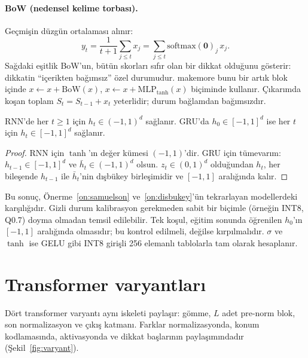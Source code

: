 \paragraph{BoW (nedensel kelime torbası).} Geçmişin düzgün ortalaması alınır:
\begin{equation}
  y_t = \frac{1}{t+1} \sum_{j \le t} x_j = \sum_{j\le t} \mathrm{softmax}(\mathbf{0})_j\, x_j .
\end{equation}
Sağdaki eşitlik BoW'un, bütün skorları sıfır olan bir dikkat olduğunu gösterir: dikkatin ``içerikten bağımsız'' özel durumudur. makemore bunu bir artık blok içinde $x \leftarrow x + \mathrm{BoW}(x)$, $x \leftarrow x + \mathrm{MLP}_{\tanh}(x)$ biçiminde kullanır. Çıkarımda koşan toplam $S_t = S_{t-1} + x_t$ yeterlidir; durum bağlamdan bağımsızdır.

\begin{onerme}\label{on:rnn}
RNN'de her $t \ge 1$ için $h_t \in (-1,1)^d$ sağlanır. GRU'da $h_0 \in [-1,1]^d$ ise her $t$ için $h_t \in [-1,1]^d$ sağlanır.
\end{onerme}
\begin{proof}
RNN için $\tanh$'ın değer kümesi $(-1,1)$'dir. GRU için tümevarım: $h_{t-1} \in [-1,1]^d$ ve $\bar h_t \in (-1,1)^d$ olsun. $z_t \in (0,1)^d$ olduğundan $h_t$, her bileşende $h_{t-1}$ ile $\bar h_t$'nin dışbükey birleşimidir ve $[-1,1]$ aralığında kalır.
\end{proof}

\noindent Bu sonuç, Önerme~\ref{on:samuelson} ve~\ref{on:disbukey}'ün tekrarlayan modellerdeki karşılığıdır. Gizli durum kalibrasyon gerekmeden sabit bir biçimle (örneğin INT8, Q0.7) doyma olmadan temsil edilebilir. Tek koşul, eğitim sonunda öğrenilen $h_0$'ın $[-1,1]$ aralığında olmasıdır; bu kontrol edilmeli, değilse kırpılmalıdır. $\sigma$ ve $\tanh$ ise GELU gibi INT8 girişli 256 elemanlı tablolarla tam olarak hesaplanır.

\section{Transformer varyantları}\label{sec:varyant}

Dört transformer varyantı aynı iskeleti paylaşır: gömme, $L$ adet pre-norm blok, son normalizasyon ve çıkış katmanı. Farklar normalizasyonda, konum kodlamasında, aktivasyonda ve dikkat başlarının paylaşımındadır (Şekil~\ref{fig:varyant}).

